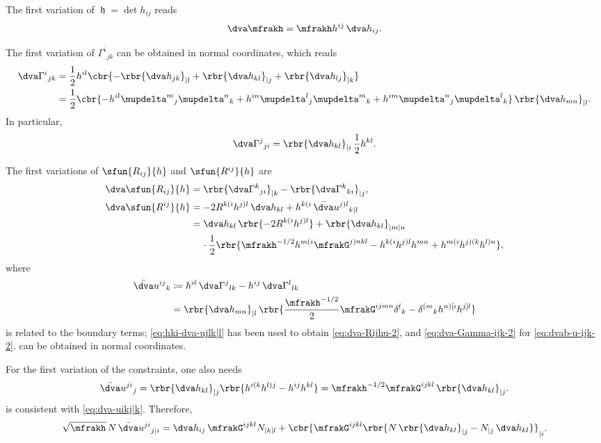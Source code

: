 \documentclass[a4paper,11pt]{article}
\begin{document}
The first variation of $\mfrakh = \det h_{ij}$ reads
\begin{align}
\dva \mfrakh = \mfrakh h^{ij}\,\dva h_{ij}.
\end{align}

The first variation of $\Gamma^i{}_{jk}$ can be obtained in normal coordinates,
which reads
\begin{align}
\dva \Gamma^{i}{}_{jk} &= \frac{1}{2} h^{il}
\cbr{-\rbr{\dva h_{jk}}_{|l} + \rbr{\dva h_{kl}}_{|j} + \rbr{\dva h_{lj}}_{|k}}
\\
&= \frac{1}{2} \cbr{-h^{il}\mupdelta^m{}_j\mupdelta^n{}_k
+h^{in}\mupdelta^l{}_j\mupdelta^m{}_k
+h^{im}\mupdelta^n{}_j\mupdelta^l{}_k}\,\rbr{\dva h_{mn}}_{|l}.
\label{eq:dva-Gamma-ijk-2}
\end{align}
In particular,
\begin{align}
\dva \Gamma^j{}_{ji} = \rbr{\dva h_{kl}}_{|i}\,\frac{1}{2}h^{kl}.
\end{align}


The first variations of $\sfun{R_{ij}}{h}$ and $\sfun{R^{ij}}{h}$ are
\begin{align}
\dva \sfun{R_{ij}}{h} &=
\rbr{\dva\Gamma^k{}_{ji}}_{|k} - \rbr{\dva\Gamma^k{}_{ki}}_{|j},
\label{eq:dva-Rij-low}
\\
\dva \sfun{R^{ij}}{h} &=
-2R^{k(i}h^{j)l}\,\dva h_{kl} + h^{k(i}\,\bar{\dva}u^{j)l}{}_{k|l}
\label{eq:var-Rijhu} \\
&= \dva h_{kl}\,\rbr{-2R^{k(i}h^{j)l}} + \rbr{\dva h_{kl}}_{|m|n}
\nonumber \\
&\quad\,\cdot
\frac{1}{2}\rbr{ \mfrakh^{-1/2} h^{m(i}\mfrakG^{j)nkl}
- h^{k(i}h^{j)l}h^{mn} + h^{m(i}h^{j)(k}h^{l)n}},
\label{eq:dva-Rijhu-2}
\end{align}
where
\begin{align}
\bar{\dva}u^{ij}{}_{k} &\coloneqq
h^{il}\,\dva\Gamma^{j}{}_{lk} - h^{ij}\,\dva\Gamma^{l}{}_{lk}
\\
&= \rbr{\dva h_{mn}}_{|l}\,\rbr{
\frac{\mfrakh^{-1/2}}{2} \mfrakG^{ijmn} \delta^{l}{}_{k} -
\delta^{(m}{}_{k}h^{n)[i}h^{j]l}}
\label{eq:dvab-u-ijk-2}
\end{align}
is related to the boundary terms; \cref{eq:hki-dva-ujlk|l} has been used
to obtain \cref{eq:dva-Rijhu-2}, and \cref{eq:dva-Gamma-ijk-2} for 
\cref{eq:dvab-u-ijk-2}.  can be obtained in normal 
coordinates.

For the first variation of the constraints, one also needs
\begin{align}
\bar{\dva}u^{ji}{}_{j} = \rbr{\dva h_{kl}}_{|j}
\rbr{h^{i(k}h^{l)j}-h^{ij}h^{kl}}
= \mfrakh^{-1/2}\mfrakG^{ijkl}\,\rbr{\dva h_{kl}}_{|j}.
\label{eq:dva-ujij}
\end{align}
 is consistent with \cref{eq:dva-uikj|k}.
Therefore, 
\begin{align}
\sqrt{\mfrakh}\,N \,\bar{\dva}u^{ji}{}_{j|i} =
\dva h_{ij}\,\mfrakG^{ijkl}N_{|k|l}
+\cbr{\mfrakG^{ijkl}
\rbr{N\,\rbr{\dva h_{kl}}_{|j} - N_{|j}\,\dva h_{kl}} }_{|i}.
\end{align}
\end{document}
